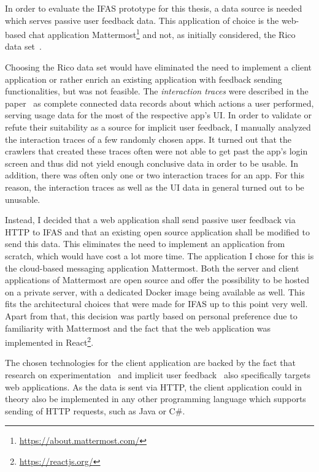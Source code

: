 In order to evaluate the \ac{IFAS} prototype for this thesis, a data source is needed which serves passive user feedback data.
This application of choice is the web-based chat application Mattermost\footnote{\url{https://about.mattermost.com/}} and not, as initially considered, the Rico data set~\cite{Deka:2017:Rico}.

Choosing the Rico data set would have eliminated the need to implement a client application or rather enrich an existing application with feedback sending functionalities, but was not feasible.
The \emph{interaction traces} were described in the paper~\cite{Deka:2017:Rico} as complete connected data records about which actions a user performed, serving usage data for the most of the respective app's \ac{UI}.
In order to validate or refute their suitability as a source for implicit user feedback, I manually analyzed the interaction traces of a few randomly chosen apps.
It turned out that the crawlers that created these traces often were not able to get past the app's login screen and thus did not yield enough conclusive data in order to be usable.
In addition, there was often only one or two interaction traces for an app.
For this reason, the interaction traces as well as the \ac{UI} data in general turned out to be unusable.

Instead, I decided that a web application shall send passive user feedback via \ac{HTTP} to \ac{IFAS} and that an existing open source application shall be modified to send this data.
This eliminates the need to implement an application from scratch, which would have cost a lot more time.
The application I chose for this is the cloud-based messaging application Mattermost.
Both the server and client applications of Mattermost are open source and offer the possibility to be hosted on a private server, with a dedicated Docker image being available as well.
This fits the architectural choices that were made for \ac{IFAS} up to this point very well.
Apart from that, this decision was partly based on personal preference due to familiarity with Mattermost and the fact that the web application was implemented in React\footnote{\url{https://reactjs.org/}}.

The chosen technologies for the client application are backed by the fact that research on experimentation~\cite{Dmitriev2017,Kohavi2013a} and implicit user feedback~\cite{Joachims2005,Huang2011} also specifically targets web applications.
As the data is sent via \ac{HTTP}, the client application could in theory also be implemented in any other programming language which supports sending of \ac{HTTP} requests, such as Java or C\#.

